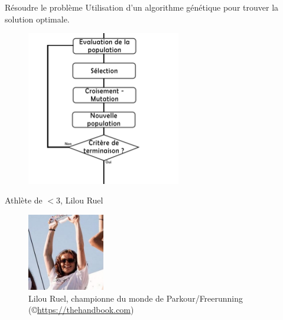 \documentclass[aspectratio=43, usepdftitle=false, xcolor={dvipsnames}]{beamer}
\begin{document}
\begin{frame}{Résoudre le problème}
	Utilisation d'un algorithme génétique pour trouver la solution optimale.
	\begin{figure}
		\center
		\includegraphics[width=0.6\textwidth]{images/Algo Genetq.png}
	\end{figure}
\end{frame}


\begin{frame}{Athlète de $<$3, Lilou Ruel}
	\begin{figure}
		\center
		\includegraphics[width=0.3\textwidth]{images/lilou.jpg}
		\caption{Lilou Ruel, championne du monde de Parkour/Freerunning (©\url{https://thehandbook.com})}
	\end{figure}
\end{frame}
\end{document}
